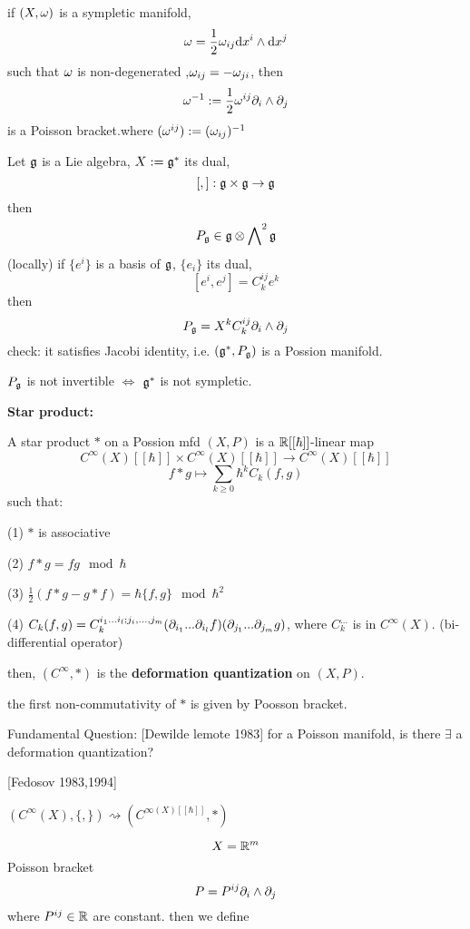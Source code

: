 \begin{example}
if $(X,\omega)$ is a sympletic manifold, 
$$\omega=\frac{1}{2}\omega_{ij}\mathrm{d} x^i\wedge\mathrm{d} x^{j}$$
such that $\omega$ is non-degenerated ,$\omega_{ij}=-\omega_{ji}$,
then
$$\omega^{-1}:=\frac{1}{2}\omega^{ij}\partial_i\wedge\partial_j$$
is a Poisson bracket.where $(\omega^{ij}):=(\omega_{ij})^{-1}$
\end{example}

\begin{example}
Let $\mathfrak{g}$ is a Lie algebra, $X:=\mathfrak{g}^*$ its dual, 
$$[,]:\mathfrak{g}\times\mathfrak{g}\to\mathfrak{g}$$
then 
$$P_{\mathfrak{g}}\in \mathfrak{g}\otimes\bigwedge\nolimits^{2}\mathfrak{g}$$
(locally)
if $\{e^i\}$ is a basis of $\mathfrak{g}$, $\{e_i\}$ its dual,
$$[e^i,e^j]=C^{ij}_ke^k$$
then
$$P_{\mathfrak{g}}=X^kC^{ij}_k\partial_i\wedge\partial_j$$
check: it satisfies Jacobi identity, i.e. 
$(\mathfrak{g}^*,P_{\mathfrak{g}})$ is a Possion manifold.
\end{example}

\begin{rem}
$P_{\mathfrak{g}}$ is not invertible $\iff$ 
$\mathfrak{g}^*$ is not sympletic.
\end{rem}

\textbf{Star product:}

\begin{definition}
A star product $*$ on a Possion mfd $(X,P)$ 
is a $\mathbb{R}[[\hbar]]$-linear map
$$C^{\infty}(X)[[\hbar]]\times C^{\infty}(X)[[\hbar]]\to C^{\infty}(X)[[\hbar]]$$
$$f*g\mapsto \sum_{k\geq 0}\hbar^kC_k(f,g)$$
such that:

(1) $*$ is associative

(2) $f*g=fg\mod \hbar$

(3) $\frac{1}{2}(f*g-g*f)=\hbar\{f,g\}\mod\hbar^2$

(4) $C_k(f,g)=C_k^{i_1...i_l;j_i,...,j_m}(\partial_{i_1}...\partial_{i_l}f)
(\partial_{j_1}...\partial_{j_m}g)$, where $C_k^{...}$ is in $C^{\infty}(X)$.
(bi-differential operator)
\vs


then, $(C^{\infty},*)$ is the \textbf{deformation quantization} on $(X,P)$.
\end{definition}

the first non-commutativity of $*$ is given 
by Poosson bracket.

Fundamental Question:
[Dewilde lemote 1983] for a Poisson manifold, is there $\exists$
a deformation quantization?

[Fedosov 1983,1994]

\begin{example}
$(C^{\infty}(X),\{,\})\rightsquigarrow(C^{\infty(X)[[\hbar]]},*)$

$$X=\mathbb{R}^m$$
Poisson bracket
$$P=P^{ij}\partial_i\wedge\partial_j$$
where $P^{ij}\in\mathbb{R}$ are constant.
then we define

\end{example}


